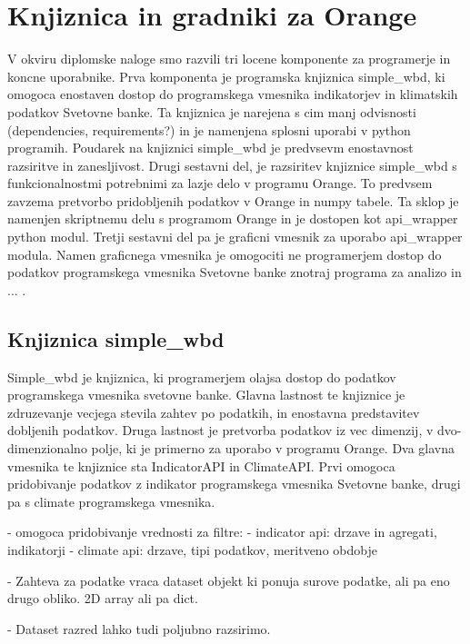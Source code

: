 \chapter{Knjiznica in gradniki za Orange}

V okviru diplomske naloge smo razvili tri locene komponente za programerje in
koncne uporabnike. Prva komponenta je programska knjiznica simple\_wbd, ki
omogoca enostaven dostop do programskega vmesnika indikatorjev in klimatskih
podatkov Svetovne banke. Ta knjiznica je narejena s cim manj odvisnosti
(dependencies, requirements?) in je namenjena splosni uporabi v python
programih. Poudarek na knjiznici simple\_wbd je predvsevm enostavnost 
razsiritve in zanesljivost. Drugi sestavni del, je razsiritev knjiznice
simple\_wbd s funkcionalnostmi potrebnimi za lazje delo v programu Orange.
To predvsem zavzema pretvorbo pridobljenih podatkov v Orange in numpy tabele.
Ta sklop je namenjen skriptnemu delu s programom Orange in je dostopen kot
api\_wrapper python modul. Tretji sestavni del pa je graficni vmesnik za
uporabo api\_wrapper modula. Namen graficnega vmesnika je omogociti ne
programerjem dostop do podatkov programskega vmesnika Svetovne banke znotraj
programa za analizo in ... .

\section{Knjiznica simple\_wbd}

Simple\_wbd je knjiznica, ki programerjem olajsa dostop do podatkov
programskega vmesnika svetovne banke. Glavna lastnost te knjiznice je
zdruzevanje vecjega stevila zahtev po podatkih, in enostavna predstavitev
dobljenih podatkov. Druga lastnost je pretvorba podatkov iz vec dimenzij, v
dvo-dimenzionalno polje, ki je primerno za uporabo v programu Orange. Dva
glavna vmesnika te knjiznice sta IndicatorAPI in ClimateAPI. Prvi omogoca
pridobivanje podatkov z indikator programskega vmesnika Svetovne banke, drugi
pa s climate programskega vmesnika.




% 

- omogoca pridobivanje vrednosti za filtre:
    - indicator api: drzave in agregati, indikatorji
    - climate api: drzave, tipi podatkov, meritveno obdobje 

- Zahteva za podatke vraca dataset objekt ki ponuja surove podatke, ali pa eno
  drugo obliko. 2D array ali pa dict.

- Dataset razred lahko tudi poljubno razsirimo.



